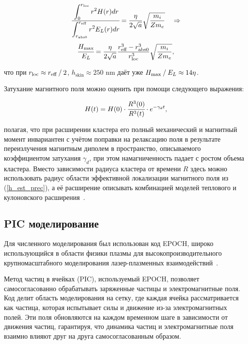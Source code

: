     \begin{equation}
        \cfrac{\displaystyle\int_{0}^{r_{\textrm{loc}}} r^2 H(r) dr}{\displaystyle\int_{r_{\textrm{abs}0}}^{r_{\textrm{eff}}} r^2 E_L(r) dr}  = \frac{\eta }{2 \sqrt{a}} \sqrt{\frac{m_i}{Z m_e}} \quad \Rightarrow 
    \end{equation}
    \begin{equation}
        \cfrac{H_{\max}}{E_L} = \frac{\eta }{2 \sqrt{a}} \frac{r_{\textrm{eff}}^3 - r_{\textrm{abs}0}^3}{r_{\textrm{loc}} ^ 3} \sqrt{\frac{m_i}{Z m_e}},
        \label{h_est_prec} 
    \end{equation}

\noindent что при $r_{\textrm{loc}} \approx {r_{\textrm{eff}}}\:/\:{2}$, $h_{\textrm{skin}} \approx 250$ nm даёт уже ${H_{\max}}\:/\:{E_L} \approx 14 \eta$.

Затухание магнитного поля можно оценить при помощи следующего выражения:

    \begin{equation}
        H(t) = H(0) \cdot \cfrac{R^3(0)}{R^3(t)}\cdot e^{-\gamma_d t},
        \label{H_evo_inva}
    \end{equation}

\noindent полагая, что при расширении кластера его полный механический и магнитный момент инвариантен с учётом поправки на релаксацию поля в результате переизлучения магнитным диполем в пространство, описываемого коэффициентом затухания $\gamma_d$, при этом намагниченность падает с ростом объема кластера. Вместо зависимости радиуса кластера от времени $R$ здесь можно использовать радиус области эффективной локализации магнитного поля из (\ref{h_est_prec}), а её расширение описывать комбинацией моделей теплового и кулоновского расширения~\cite{andr_plat_2021}.

\subsection{PIC моделирование}

Для численного моделирования был использован код EPOCH, широко использующийся в области физики плазмы для высокопроизводительного крупномасштабного моделирования лазер-плазменных взаимодействий~\cite{epochpic}.

Метод частиц в ячейках (PIC), используемый EPOCH, позволяет самосогласованно обрабатывать заряженные частицы и электромагнитные поля. Код делит область моделирования на сетку, где каждая ячейка рассматривается как частица, которая испытывает силы и движение из-за электромагнитных полей. Эти поля обновляются на каждом временном шаге в зависимости от движения частиц, гарантируя, что динамика частиц и электромагнитные поля взаимно влияют друг на друга самосогласованным образом.


